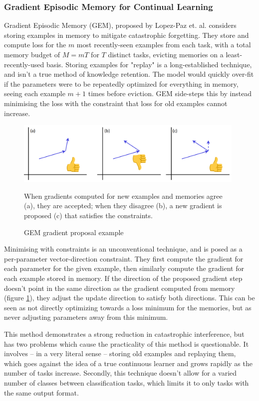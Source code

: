 \documentclass{report}
\begin{document}
\subsubsection{Gradient Episodic Memory for Continual Learning}
Gradient Episodic Memory (GEM), proposed by Lopez-Paz et. al. \parencite{gem} considers storing examples in memory to mitigate catastrophic forgetting. They store and compute loss for the $m$ most recently-seen examples from each task, with a total memory budget of $M=mT$ for $T$ distinct tasks, evicting memories on a least-recently-used basis. Storing examples for "replay" is a long-established technique, and isn't a true method of knowledge retention. The model would quickly over-fit if the parameters were to be repeatedly optimized for everything in memory, seeing each example $m+1$ times before eviction. GEM side-steps this by instead minimising the loss with the constraint that loss for old examples cannot increase. \par
\begin{figure}[h]
 \centering
 \includegraphics[width=11cm]{gem}
 \caption{GEM gradient proposal example}
 When gradients computed for new examples and memories agree (a), they are accepted; when they disagree (b), a new gradient is proposed (c) that satisfies the constraints.
 \label{fig:gem:1}
\end{figure}
Minimising with constraints is an unconventional technique, and is posed as a per-parameter vector-direction constraint. They first compute the gradient for each parameter for the given example, then similarly compute the gradient for each example stored in memory. If the direction of the proposed gradient step doesn't point in the same direction as the gradient computed from memory (figure \ref{fig:gem:1}), they adjust the update direction to satisfy both directions. This can be seen as not directly optimizing towards a loss minimum for the memories, but as never adjusting parameters away from this minimum. \par
This method demonstrates a strong reduction in catastrophic interference, but has two problems which cause the practicality of this method is questionable. It involves -- in a very literal sense -- storing old examples and replaying them, which goes against the idea of a true continuous learner and grows rapidly as the number of tasks increase. Secondly, this technique doesn't allow for a varied number of classes between classification tasks, which limits it to only tasks with the same output format. \par
\end{document}
